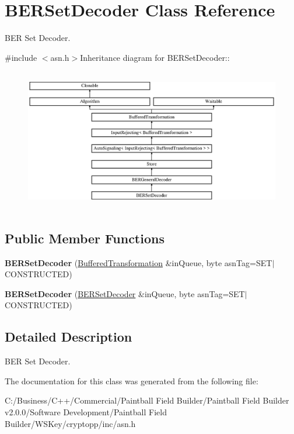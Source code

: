 \hypertarget{class_b_e_r_set_decoder}{
\section{BERSetDecoder Class Reference}
\label{class_b_e_r_set_decoder}
}


BER Set Decoder.  


{\ttfamily \#include $<$asn.h$>$}Inheritance diagram for BERSetDecoder::\begin{figure}[H]
\begin{center}
\leavevmode
\includegraphics[height=6.25698cm]{class_b_e_r_set_decoder}
\end{center}
\end{figure}
\subsection*{Public Member Functions}
\begin{DoxyCompactItemize}
\item 
\hypertarget{class_b_e_r_set_decoder_a18eebd5a5575c172f1af86ef9802d9cb}{
{\bfseries BERSetDecoder} (\hyperlink{class_buffered_transformation}{BufferedTransformation} \&inQueue, byte asnTag=SET$|$CONSTRUCTED)}
\label{class_b_e_r_set_decoder_a18eebd5a5575c172f1af86ef9802d9cb}

\item 
\hypertarget{class_b_e_r_set_decoder_af7a4474c9e30d6c1a53b199e97a7a601}{
{\bfseries BERSetDecoder} (\hyperlink{class_b_e_r_set_decoder}{BERSetDecoder} \&inQueue, byte asnTag=SET$|$CONSTRUCTED)}
\label{class_b_e_r_set_decoder_af7a4474c9e30d6c1a53b199e97a7a601}

\end{DoxyCompactItemize}


\subsection{Detailed Description}
BER Set Decoder. 

The documentation for this class was generated from the following file:\begin{DoxyCompactItemize}
\item 
C:/Business/C++/Commercial/Paintball Field Builder/Paintball Field Builder v2.0.0/Software Development/Paintball Field Builder/WSKey/cryptopp/inc/asn.h\end{DoxyCompactItemize}
